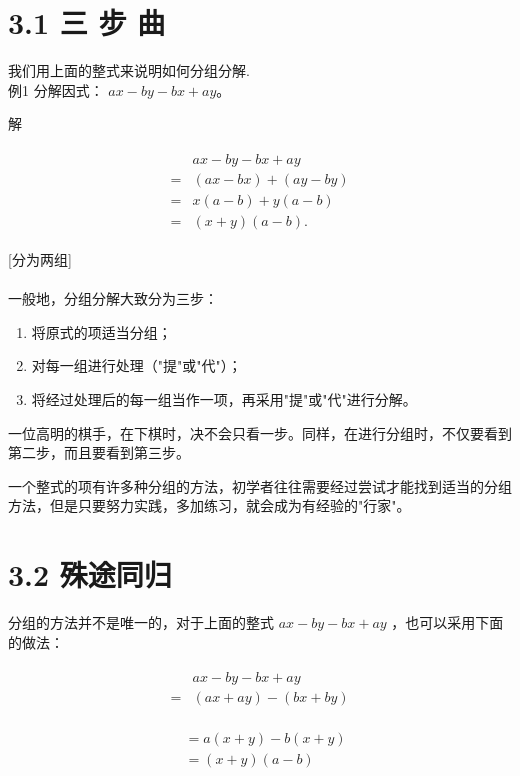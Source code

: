 \documentclass[10pt]{article}
\begin{document}
\section*{3.1 三 步 曲}
我们用上面的整式来说明如何分组分解.\\
例1 分解因式： $a x-b y-b x+a y 。$

解

\begin{align*}
\begin{aligned}
& a x-b y-b x+a y \\
= & (a x-b x)+(a y-b y) \\
= & x(a-b)+y(a-b) \\
= & (x+y)(a-b) .
\end{aligned}
\end{align*}

[分为两组]\\
["提"]\\
[再"提"]

一般地，分组分解大致分为三步：

\begin{enumerate}
  \item 将原式的项适当分组；
  \item 对每一组进行处理（"提"或"代"）；
  \item 将经过处理后的每一组当作一项，再采用"提"或"代"进行分解。
\end{enumerate}

一位高明的棋手，在下棋时，决不会只看一步。同样，在进行分组时，不仅要看到第二步，而且要看到第三步。

一个整式的项有许多种分组的方法，初学者往往需要经过尝试才能找到适当的分组方法，但是只要努力实践，多加练习，就会成为有经验的"行家"。

\section*{3.2 殊途同归}
分组的方法并不是唯一的，对于上面的整式 $a x-b y-b x+a y$ ，也可以采用下面的做法：

\begin{align*}
\begin{aligned}
& a x-b y-b x+a y \\
= & (a x+a y)-(b x+b y)
\end{aligned}
\end{align*}

\begin{align*}
\begin{aligned}
& =a(x+y)-b(x+y) \\
& =(x+y)(a-b)
\end{aligned}
\end{align*}
\end{document}

